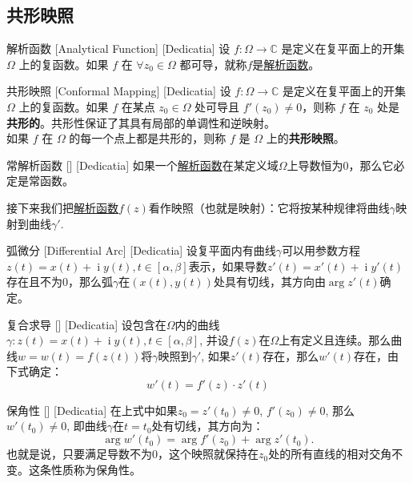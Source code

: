 \documentclass[UTF8]{ctexart}
\DeclareMathOperator{\ii}{\mathrm{i}}
\newcommand{\AnalyticalFunction}{\hyperref[dfn:AnalyticalFunction]{解析函数}}
\begin{document}
\subsection{共形映照}
\begin{dfn}
    [UUID]
    {解析函数}
    [Analytical Function]
    [Dedicatia]
    设 \( f: \Omega \to \mathbb{C} \) 是定义在复平面上的开集 \( \Omega \) 上的复函数。如果 \( f \) 在 \(\forall z_0 \in \Omega \) 都可导，就称$f$是\AnalyticalFunction 。
\end{dfn}
\begin{dfn}
    [UUID]
    {共形映照\label{dfn:ConformalMapping}}
    [Conformal Mapping]
    [Dedicatia]
    设 \( f: \Omega \to \mathbb{C} \) 是定义在复平面上的开集 \( \Omega \) 上的复函数。如果 \( f \) 在某点 \( z_0 \in \Omega \) 处可导且 \( f'(z_0) \neq 0 \)，则称 \( f \) 在 \( z_0 \) 处是\textbf{共形的}。共形性保证了其具有局部的单调性和逆映射。\\
    如果 \( f \) 在 \( \Omega \) 的每一个点上都是共形的，则称 \( f \) 是 \( \Omega \) 上的\textbf{共形映照}。
\end{dfn}
\begin{ppt}
    [UUID]
    {常解析函数\label{dfn:TrivialAnalyticalFunction}}
    []
    [Dedicatia]
    如果一个\AnalyticalFunction 在某定义域$\Omega$上导数恒为0，那么它必定是常函数。
\end{ppt}
接下来我们把\AnalyticalFunction $f(z)$看作映照（也就是映射）：它将按某种规律将曲线$\gamma$映射到曲线$\gamma'$. 
\begin{dfn}
    [UUID]
    {弧微分}
    [Differential Arc]
    [Dedicatia]
    设复平面内有曲线$\gamma$可以用参数方程$z(t)=x(t)+\ii y(t), t\in[\alpha,\beta]$表示，如果导数$z'(t)=x'(t)+\ii y'(t)$存在且不为0，那么弧$\gamma$在$(x(t),y(t))$处具有切线，其方向由$\arg z'(t)$确定。
\end{dfn}
\begin{thm}
    [UUID]
    {复合求导}
    []
    [Dedicatia]
    设包含在$\Omega$内的曲线$\gamma:z(t)=x(t)+\ii y(t), t\in[\alpha,\beta]$, 并设$f(z)$在$\Omega$上有定义且连续。那么曲线$w=w(t)=f(z(t))$将$\gamma$映照到$\gamma'$, 如果$z'(t)$存在，那么$w'(t)$存在，由下式确定：
    \[w'(t)=f'(z)\cdot z'(t)\]
\end{thm}
\begin{thm}
    [UUID]
    {保角性}
    []
    [Dedicatia]
    在上式中如果$z_0=z'(t_0)\neq 0$, $f'(z_0)\neq 0$, 那么$w'(t_0)\neq 0$, 即曲线$\gamma$在$t=t_0$处有切线，其方向为：
    \[\arg w'(t_0)=\arg f'(z_0)+\arg z'(t_0).\]
    也就是说，只要满足导数不为0，这个映照就保持在$z_0$处的所有直线的相对交角不变。这条性质称为保角性。
\end{thm}
\end{document}
